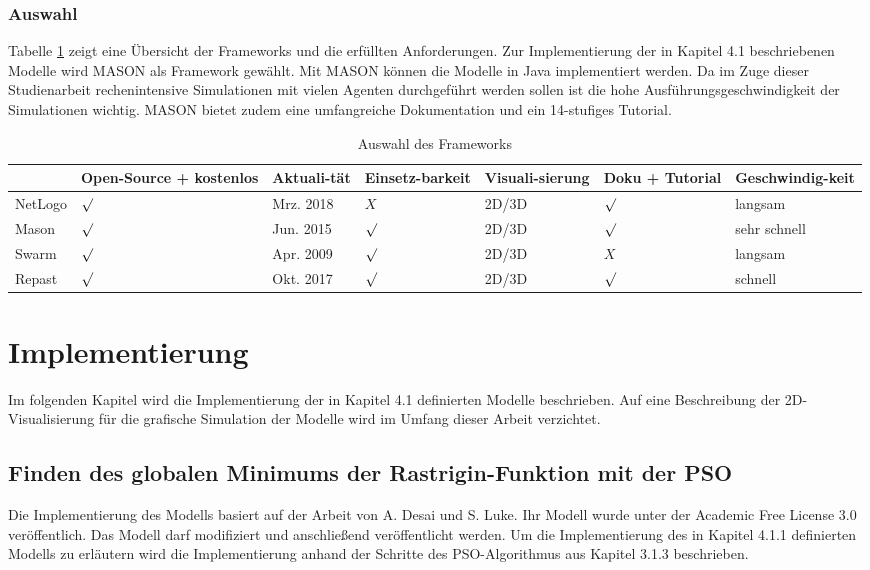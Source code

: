 \documentclass[a4paper, 11pt]{article}
\begin{document}
\subsubsection{Auswahl}
Tabelle \ref{tabframework1} zeigt eine Übersicht der Frameworks und die erfüllten Anforderungen.
Zur Implementierung der in Kapitel 4.1 beschriebenen Modelle wird MASON als Framework gewählt. Mit MASON können die Modelle in Java implementiert werden. Da im Zuge dieser Studienarbeit rechenintensive Simulationen mit vielen Agenten durchgeführt werden sollen ist die hohe Ausführungsgeschwindigkeit der Simulationen wichtig. MASON bietet zudem eine umfangreiche Dokumentation und ein 14-stufiges Tutorial. 
\begin{table}[h]
	\begin{tabular}{p{1.5cm}|p{1.5cm}|p{1.6cm}|p{1.7cm}|p{1.3cm}|p{1.3cm}|p{2.7cm}}
		& Open-Source + kostenlos & Aktuali-tät & Einsetz-barkeit & Visuali-sierung & Doku + Tutorial & Geschwindig-keit\\ \hline\hline
		NetLogo & $\surd$ & Mrz. 2018 & $X$ & 2D/3D & $\surd$ & langsam\\ \hline
		Mason & $\surd$ & Jun. 2015 & $\surd$ & 2D/3D & $\surd$ & sehr schnell\\ \hline
		Swarm & $\surd$  & Apr. 2009 & $\surd$ & 2D/3D & $X$ & langsam\\ \hline
		Repast & $\surd$ & Okt. 2017 & $\surd$ & 2D/3D & $\surd$ & schnell\\ \hline
	\end{tabular}
	\caption{Auswahl des Frameworks}
	\label{tabframework1}
\end{table}
\newpage
\section{Implementierung}
Im folgenden Kapitel wird die Implementierung der in Kapitel 4.1 definierten Modelle beschrieben. Auf eine Beschreibung der 2D-Visualisierung für die grafische Simulation der Modelle wird im Umfang dieser Arbeit verzichtet.
\subsection{Finden des globalen Minimums der Rastrigin-Funktion mit der \acs{PSO}}
Die Implementierung des Modells basiert auf der Arbeit von A. Desai und S. Luke. Ihr Modell wurde unter der Academic Free License 3.0 veröffentlich. Das Modell darf modifiziert und anschließend veröffentlicht werden. Um die Implementierung des in Kapitel 4.1.1 definierten Modells zu erläutern wird die Implementierung anhand der Schritte des \acs{PSO}-Algorithmus aus Kapitel 3.1.3 beschrieben.
\end{document}
